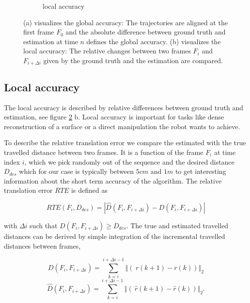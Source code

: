 \begin{figure}
\begin{subfigure}[b]{0.28\textwidth}
    \caption{local accuracy}
    \label{fig:4}
  \end{subfigure}
  \hspace*{1cm}
\caption{(a) visualizes the global accuracy: The trajectories are aligned at the first frame $F_{0}$ and the absolute difference between ground truth and estimation at time $n$ defines the global accuracy. (b) visualizes the local accuracy: The relative changes between two frames $F_i$ and $F_{i+\Delta i}$ given by the ground truth and the estimation are compared.}
\label{pics:absolute_relative}
\end{figure}





\subsection{Local accuracy}
\label{sec:local}

The local accuracy is described by relative differences between ground truth and estimation, see figure \ref{pics:absolute_relative} b. Local accuracy is important for tasks like dense reconstruction of a surface or a direct manipulation the robot wants to achieve. 

To describe the relative translation error we compare the estimated with the true travelled distance between two frames. It is a function of the frame $F_i$ at time index $i$, which we pick randomly out of the sequence and the desired distance $D_{des}$ which for our case is typically between $5cm$ and $1m$ to get interesting information about the short term accuracy of the algorithm. The relative translation error $RTE$ is defined as

\begin{equation}
RTE \left( F_i, D_{des} \right) = \left| \hat{D} \left( F_i, F_{i+\Delta i} \right) - D \left( F_i, F_{i+\Delta i} \right)\right|
\end{equation}

with $ \Delta i $ such that $ D \left( F_i, F_{i+\Delta i} \right) \geq D_{des} $. The true and estimated travelled distances can be derived by simple integration of the incremental travelled distances between frames,

\begin{equation}
       D \left( F_i, F_{i+\Delta i} \right) = \sum_{k=i}^{i+\Delta i-1} \left\Vert\left(\ r \left( k+1 \right) - r \left( k \right) \right) \right\Vert_2
\end{equation}
\begin{equation}
       \hat{D} \left( F_i, F_{i+\Delta i} \right) = \sum_{k=i}^{i+\Delta i-1} \left\Vert\left(\ \hat{r} \left( k+1 \right) - \hat{r} \left( k \right) \right) \right\Vert_2 .
\end{equation}

